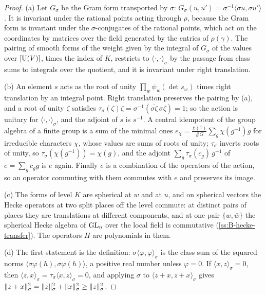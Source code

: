 \begin{proof}
(a) Let $G_\sigma$ be the Gram form transported by $\sigma$: $G_\sigma(u,u')=\sigma^{-1}\langle\sigma u,\sigma u'\rangle$. It is invariant under the rational points acting through $\rho$, because the Gram form is invariant
under the $\sigma$-conjugates of the rational points, which act on the coordinates by matrices over the field generated by the entries of $\rho(\gamma)$. The pairing of smooth forms of the weight given by the
integral of $G_\sigma$ of the values over $[\operatorname{U}(V)]$, times the index of $K$, restricts to $\langle\cdot,\cdot\rangle_\sigma$ by the passage from class sums to integrals over the quotient, and it is invariant under right translation.

(b) An element $s$ acts as the root of unity $\prod_w\psi_w(\det s_w)$ times right translation by an integral point. Right translation preserves the pairing by (a), and a root of unity $\zeta$ satisfies
$\tau_\sigma(\zeta)\zeta=\sigma^{-1}(\overline{\sigma\zeta}\,\sigma\zeta)=1$; so the action is unitary for $\langle\cdot,\cdot\rangle_\sigma$, and the adjoint of $s$ is $s^{-1}$. A central idempotent of the group algebra of a finite group is a sum of the minimal ones
$e_\chi=\frac{\chi(1)}{\#G}\sum_g\chi(g^{-1})g$ for irreducible characters $\chi$, whose values are sums of roots of unity; $\tau_\sigma$ inverts roots of unity, so $\tau_\sigma(\chi(g^{-1}))=\chi(g)$, and the adjoint
$\sum_g\tau_\sigma(c_g)\,g^{-1}$ of $e=\sum_gc_gg$ is $e$ again. Finally $e$ is a combination of the operators of the action, so an operator commuting with them commutes with $e$ and preserves its image.

(c) The forms of level $K$ are spherical at $w$ and at $u$, and on spherical vectors the Hecke operators at two split places off the level commute: at distinct pairs of places they are translations at
different components, and at one pair $\{w,\bar w\}$ the spherical Hecke algebra of $\operatorname{GL}_n$ over the local field is commutative (\cref{ss:B-hecke-transfer}). The operators $H$ are polynomials in them.

(d) The first statement is the definition: $\sigma\langle\varphi,\varphi\rangle_\sigma$ is the class sum of the squared norms $\langle\sigma\varphi(h),\sigma\varphi(h)\rangle$, a positive real number unless $\varphi=0$. If $\langle x,z\rangle_\sigma=0$, then
$\langle z,x\rangle_\sigma=\tau_\sigma\langle x,z\rangle_\sigma=0$, and applying $\sigma$ to $\langle z+x,z+x\rangle_\sigma$ gives $\lVert z+x\rVert_\sigma^2=\lVert z\rVert_\sigma^2+\lVert x\rVert_\sigma^2\ge\lVert z\rVert_\sigma^2$.
\end{proof}

